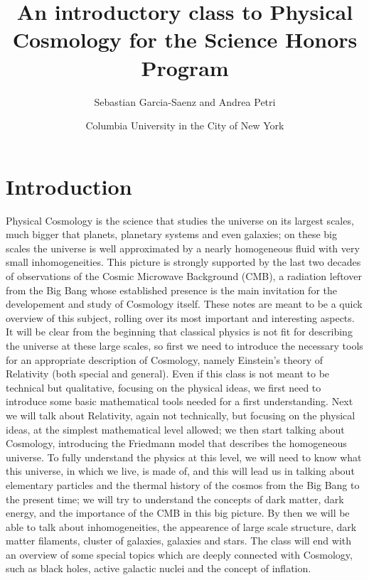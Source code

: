 \documentclass[11pt, a4paper,oneside,openright]{book}
\numberwithin{equation}{section}
\begin{document}
\title{An introductory class to Physical Cosmology for the Science Honors Program}
\author{Sebastian Garcia-Saenz and Andrea Petri}
\date{Columbia University in the City of New York}
\maketitle

\chapter*{Introduction}
Physical Cosmology is the science that studies the universe on its largest scales, much bigger that planets, planetary systems and even galaxies; on these big scales the universe is well approximated by a nearly homogeneous fluid with very small inhomogeneities. This picture is strongly supported by the last two decades of observations of the Cosmic Microwave Background (CMB), a radiation leftover from the Big Bang whose established presence is the main invitation for the developement and study of Cosmology itself. These notes are meant to be a quick overview of this subject, rolling over its most important and interesting aspects. It will be clear from the beginning that classical physics  is not fit for describing the universe at these large scales, so first we need to introduce the necessary tools for an appropriate description of Cosmology, namely Einstein's theory of Relativity (both special and general). Even if this class is not meant to be technical but qualitative, focusing on the physical ideas, we 
first need to introduce some basic mathematical tools needed for a first understanding. Next we will talk about Relativity, again not technically, but focusing on the physical ideas, at the simplest mathematical level allowed; we then start talking about Cosmology, introducing the Friedmann model that describes the homogeneous universe. To fully understand the physics at this level, we will need to know what this universe, in which we live, is made of, and this will lead us in talking about elementary particles and the thermal history of the cosmos from the Big Bang to the present time; we will try to understand the concepts of dark matter, dark energy, and the importance of the CMB in this big picture. By then we will be able to talk about inhomogeneities, the appearence of large scale structure, dark matter filaments, cluster of galaxies, galaxies and stars. The class will end with an overview of some special topics which are deeply connected with Cosmology, such as black holes, active galactic nuclei and 
the concept of inflation. 
\end{document}
